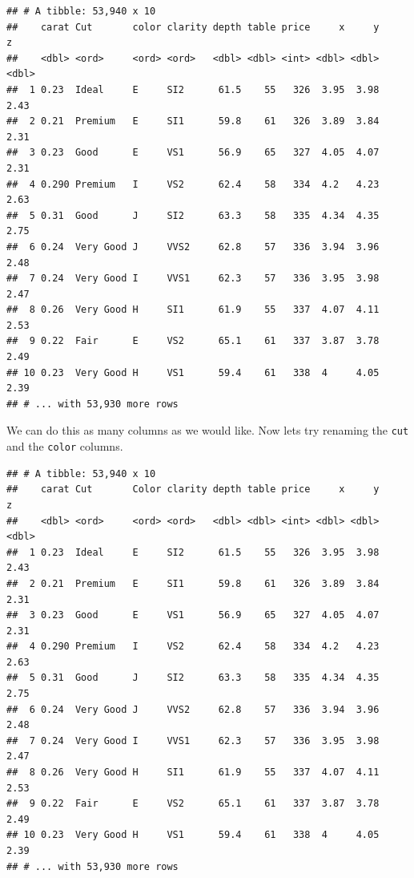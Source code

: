 \documentclass[
]{book}
\newenvironment{Shaded}{\begin{snugshade}}{\end{snugshade}}
\newcommand{\DataTypeTok}[1]{\textcolor[rgb]{0.13,0.29,0.53}{#1}}
\newcommand{\KeywordTok}[1]{\textcolor[rgb]{0.13,0.29,0.53}{\textbf{#1}}}
\newcommand{\NormalTok}[1]{#1}
\newcommand{\OperatorTok}[1]{\textcolor[rgb]{0.81,0.36,0.00}{\textbf{#1}}}
\newcommand{\StringTok}[1]{\textcolor[rgb]{0.31,0.60,0.02}{#1}}
\begin{document}
\begin{verbatim}
## # A tibble: 53,940 x 10
##    carat Cut       color clarity depth table price     x     y     z
##    <dbl> <ord>     <ord> <ord>   <dbl> <dbl> <int> <dbl> <dbl> <dbl>
##  1 0.23  Ideal     E     SI2      61.5    55   326  3.95  3.98  2.43
##  2 0.21  Premium   E     SI1      59.8    61   326  3.89  3.84  2.31
##  3 0.23  Good      E     VS1      56.9    65   327  4.05  4.07  2.31
##  4 0.290 Premium   I     VS2      62.4    58   334  4.2   4.23  2.63
##  5 0.31  Good      J     SI2      63.3    58   335  4.34  4.35  2.75
##  6 0.24  Very Good J     VVS2     62.8    57   336  3.94  3.96  2.48
##  7 0.24  Very Good I     VVS1     62.3    57   336  3.95  3.98  2.47
##  8 0.26  Very Good H     SI1      61.9    55   337  4.07  4.11  2.53
##  9 0.22  Fair      E     VS2      65.1    61   337  3.87  3.78  2.49
## 10 0.23  Very Good H     VS1      59.4    61   338  4     4.05  2.39
## # ... with 53,930 more rows
\end{verbatim}

We can do this as many columns as we would like. Now lets try renaming the \texttt{cut} and the \texttt{color} columns.

\begin{Shaded}
\end{Shaded}

\begin{verbatim}
## # A tibble: 53,940 x 10
##    carat Cut       Color clarity depth table price     x     y     z
##    <dbl> <ord>     <ord> <ord>   <dbl> <dbl> <int> <dbl> <dbl> <dbl>
##  1 0.23  Ideal     E     SI2      61.5    55   326  3.95  3.98  2.43
##  2 0.21  Premium   E     SI1      59.8    61   326  3.89  3.84  2.31
##  3 0.23  Good      E     VS1      56.9    65   327  4.05  4.07  2.31
##  4 0.290 Premium   I     VS2      62.4    58   334  4.2   4.23  2.63
##  5 0.31  Good      J     SI2      63.3    58   335  4.34  4.35  2.75
##  6 0.24  Very Good J     VVS2     62.8    57   336  3.94  3.96  2.48
##  7 0.24  Very Good I     VVS1     62.3    57   336  3.95  3.98  2.47
##  8 0.26  Very Good H     SI1      61.9    55   337  4.07  4.11  2.53
##  9 0.22  Fair      E     VS2      65.1    61   337  3.87  3.78  2.49
## 10 0.23  Very Good H     VS1      59.4    61   338  4     4.05  2.39
## # ... with 53,930 more rows
\end{verbatim}
\end{document}

